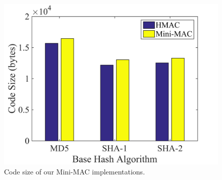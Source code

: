 	\begin{figure}
		\centering
		\includegraphics[width=\columnwidth]{figures/code_size.png}
		\caption{Code size of our Mini-MAC implementations.}
		\label{fig-code}
	\end{figure}
	
	
	